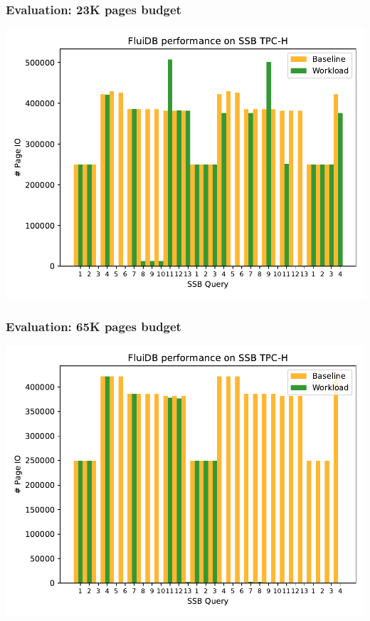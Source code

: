 \begin{frame}
  \frametitle{Evaluation: 23K pages budget}
  \includegraphics[width=.9\linewidth]{../plans/io_perf_23000.pdf}
\end{frame}

\begin{frame}
  \frametitle{Evaluation: 65K pages budget}
  \includegraphics[width=.9\linewidth]{../plans/io_perf_65000.pdf}
\end{frame}

